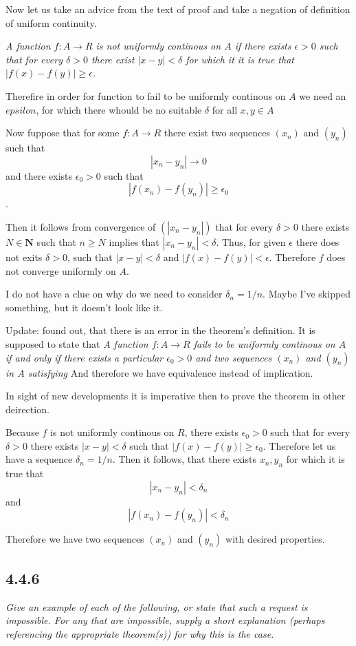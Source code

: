 \documentclass[11pt,oneside,titlepage]{book}
\begin{document}
Now let us take an advice from the text of proof and take a negation of
definition of uniform continuity.

\textit{A function $f:A \to R$ is not uniformly
 continous on $A$ if there exists $\epsilon > 0$ such that
 for every $\delta > 0$ there exist  $|x - y| < \delta$ for which it 
 it is true  that  $|f(x) - f(y)| \geq \epsilon$.}

Therefire in order for function to fail to be uniformly continous on $A$ we
need an $epsilon$, for which there whould be no suitable $\delta$ for all
$x, y \in A$

Now fuppose that for some $f: A \to R$ there exist two sequences $(x_n)$ and
$(y_n)$ such that
$$|x_n - y_n| \to 0$$
and there exists $\epsilon_0 > 0$ such that 
$$|f(x_n) - f(y_n)| \geq \epsilon_0$$.

Then it follows from convergence of $(|x_n - y_n|)$ that
for every $\delta > 0$ there exists
$N \in \textbf{N}$ such that $n \geq N$ implies
that $|x_n - y_n| < \delta$. Thus, for given $\epsilon$ there does not
exits $\delta > 0$, such that $|x - y| < \delta$ and
$|f(x) - f(y)| < \epsilon$. Therefore $f$ does not converge uniformly on
$A$.

I do not have a clue on why do we need to consider $\delta_n = 1/n$. Maybe I've
skipped something, but it doesn't look like it.

Update: found out, that there is an error in the theorem's definition. It
is supposed to state that
\textit{A function $f: A \to R$ fails to be uniformly continous on $A$ if
  and only if
  there exists a particular $\epsilon_0 > 0$ and two sequences $(x_n)$ and
  $(y_n)$ in $A$ satisfying}
And therefore we have equivalence instead of implication.

In sight of new developments it is imperative then to prove the
theorem in other deirection.

Because $f$ is not uniformly continous on $R$, there exists $\epsilon_0 > 0$
such that for every $\delta > 0$ there exists $|x - y| < \delta$ such that
$|f(x) - f(y)| \geq \epsilon_0$. Therefore let us have a sequence
$\delta_n = 1/n$. Then it follows, that there exists $x_n, y_n$ for which it
is true that
$$|x_n - y_n| < \delta_n$$
and
$$|f(x_n) - f(y_n)| < \delta_n$$

Therefore we have two sequences $(x_n)$ and $(y_n)$ with desired properties.


\subsection*{4.4.6}
\textit{Give an example of each of the following, or state that such a request is impossible. For any that are impossible, supply a short explanation (perhaps referencing the appropriate theorem(s)) for why this is the case.}
\end{document}
